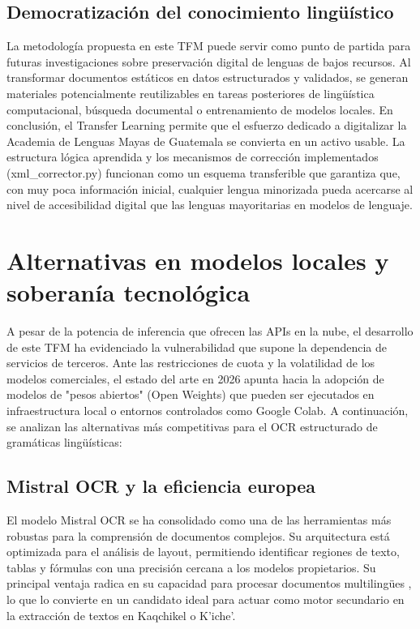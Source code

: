 \subsection{ Democratización del conocimiento lingüístico }
La metodología propuesta en este TFM puede servir como punto de partida para futuras investigaciones sobre preservación digital de lenguas de bajos recursos. Al transformar documentos estáticos en datos estructurados y validados, se generan materiales potencialmente reutilizables en tareas posteriores de lingüística computacional, búsqueda documental o entrenamiento de modelos locales.
En conclusión, el Transfer Learning permite que el esfuerzo dedicado a digitalizar la Academia de Lenguas Mayas de Guatemala se convierta en un activo usable. La estructura lógica aprendida y los mecanismos de corrección implementados (xml\_corrector.py) funcionan como un esquema transferible que garantiza que, con muy poca información inicial, cualquier lengua minorizada pueda acercarse al nivel de accesibilidad digital que las lenguas mayoritarias en modelos de lenguaje.





\section{ Alternativas en modelos locales y soberanía tecnológica }

A pesar de la potencia de inferencia que ofrecen las APIs en la nube, el desarrollo de este TFM ha evidenciado la vulnerabilidad que supone la dependencia de servicios de terceros. Ante las restricciones de cuota y la volatilidad de los modelos comerciales, el estado del arte en 2026 apunta hacia la adopción de modelos de "pesos abiertos" (Open Weights) que pueden ser ejecutados en infraestructura local o entornos controlados como Google Colab.
A continuación, se analizan las alternativas más competitivas para el OCR estructurado de gramáticas lingüísticas:

\subsection{ Mistral OCR y la eficiencia europea }
El modelo Mistral OCR se ha consolidado como una de las herramientas más robustas para la comprensión de documentos complejos. Su arquitectura está optimizada para el análisis de layout, permitiendo identificar regiones de texto, tablas y fórmulas con una precisión cercana a los modelos propietarios. Su principal ventaja radica en su capacidad para procesar documentos multilingües 
\parencite{A_Bhat_2026_WACV}, lo que lo convierte en un candidato ideal para actuar como motor secundario en la extracción de textos en Kaqchikel o K’iche’.




